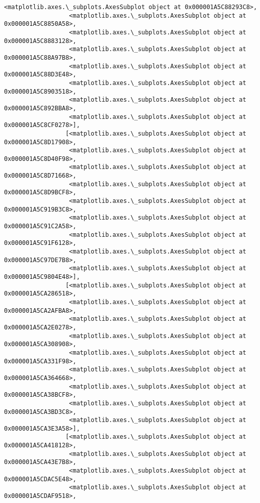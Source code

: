 \documentclass[11pt]{article}
\begin{document}
\begin{Verbatim}[commandchars=\\\{\}]
                  <matplotlib.axes.\_subplots.AxesSubplot object at 0x000001A5C88293C8>,
                  <matplotlib.axes.\_subplots.AxesSubplot object at 0x000001A5C8850A58>,
                  <matplotlib.axes.\_subplots.AxesSubplot object at 0x000001A5C8883128>,
                  <matplotlib.axes.\_subplots.AxesSubplot object at 0x000001A5C88A97B8>,
                  <matplotlib.axes.\_subplots.AxesSubplot object at 0x000001A5C88D3E48>,
                  <matplotlib.axes.\_subplots.AxesSubplot object at 0x000001A5C8903518>,
                  <matplotlib.axes.\_subplots.AxesSubplot object at 0x000001A5C892BBA8>,
                  <matplotlib.axes.\_subplots.AxesSubplot object at 0x000001A5C8CF0278>],
                 [<matplotlib.axes.\_subplots.AxesSubplot object at 0x000001A5C8D17908>,
                  <matplotlib.axes.\_subplots.AxesSubplot object at 0x000001A5C8D40F98>,
                  <matplotlib.axes.\_subplots.AxesSubplot object at 0x000001A5C8D71668>,
                  <matplotlib.axes.\_subplots.AxesSubplot object at 0x000001A5C8D9BCF8>,
                  <matplotlib.axes.\_subplots.AxesSubplot object at 0x000001A5C919B3C8>,
                  <matplotlib.axes.\_subplots.AxesSubplot object at 0x000001A5C91C2A58>,
                  <matplotlib.axes.\_subplots.AxesSubplot object at 0x000001A5C91F6128>,
                  <matplotlib.axes.\_subplots.AxesSubplot object at 0x000001A5C97DE7B8>,
                  <matplotlib.axes.\_subplots.AxesSubplot object at 0x000001A5C9804E48>],
                 [<matplotlib.axes.\_subplots.AxesSubplot object at 0x000001A5CA286518>,
                  <matplotlib.axes.\_subplots.AxesSubplot object at 0x000001A5CA2AFBA8>,
                  <matplotlib.axes.\_subplots.AxesSubplot object at 0x000001A5CA2E0278>,
                  <matplotlib.axes.\_subplots.AxesSubplot object at 0x000001A5CA308908>,
                  <matplotlib.axes.\_subplots.AxesSubplot object at 0x000001A5CA331F98>,
                  <matplotlib.axes.\_subplots.AxesSubplot object at 0x000001A5CA364668>,
                  <matplotlib.axes.\_subplots.AxesSubplot object at 0x000001A5CA38BCF8>,
                  <matplotlib.axes.\_subplots.AxesSubplot object at 0x000001A5CA3BD3C8>,
                  <matplotlib.axes.\_subplots.AxesSubplot object at 0x000001A5CA3E3A58>],
                 [<matplotlib.axes.\_subplots.AxesSubplot object at 0x000001A5CA418128>,
                  <matplotlib.axes.\_subplots.AxesSubplot object at 0x000001A5CA43E7B8>,
                  <matplotlib.axes.\_subplots.AxesSubplot object at 0x000001A5CDAC5E48>,
                  <matplotlib.axes.\_subplots.AxesSubplot object at 0x000001A5CDAF9518>,

\end{Verbatim}
\end{document}
